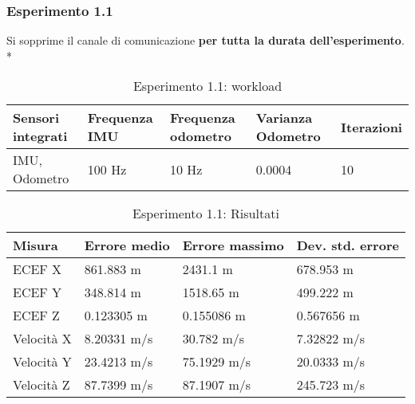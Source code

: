\subsubsection{Esperimento 1.1}
Si sopprime il canale di comunicazione \textbf{per tutta la durata dell'esperimento}.\\*
\begin{table}[h]
	\centering
	\begin{tabular}{|p{3.25cm}|p{2cm}|p{2cm}|p{2cm}|p{2cm}|}
		\hline 
		\textbf{Sensori integrati} & \textbf{Frequenza IMU}  & \textbf{Frequenza odometro} & \textbf{Varianza Odometro} & \textbf{Iterazioni} \\ 
		\hline 
		IMU, Odometro & 100 Hz & 10 Hz & 0.0004 & 10 \\
		\hline 
	\end{tabular}
	\caption{Esperimento 1.1: workload}
\end{table}
	\begin{table}[h]
	\centering
	\begin{tabular}{|p{2cm}|p{3cm}|p{3cm}|p{3cm}|}
		\hline 
		\textbf{Misura} & \textbf{Errore medio}  & \textbf{Errore massimo} & \textbf{Dev. std. errore}\\ 
		\hline 
		ECEF X & 861.883 m & 2431.1 m & 678.953 m \\ 
		\hline 
		ECEF Y & 348.814 m & 1518.65 m & 499.222 m \\ 
		\hline 
		ECEF Z & 0.123305 m & 0.155086 m & 0.567656 m \\ 
		\hline 
		Velocit\`a X & 8.20331 m/s & 30.782 m/s & 7.32822 m/s \\ 
		\hline 
		Velocit\`a Y & 23.4213 m/s & 75.1929 m/s & 20.0333 m/s \\ 
		\hline 
		Velocit\`a Z & 87.7399 m/s & 87.1907 m/s & 245.723 m/s \\ 
		\hline 
	\end{tabular}
	\caption{Esperimento 1.1: Risultati}
	\label{tab:exp11res}
\end{table}
